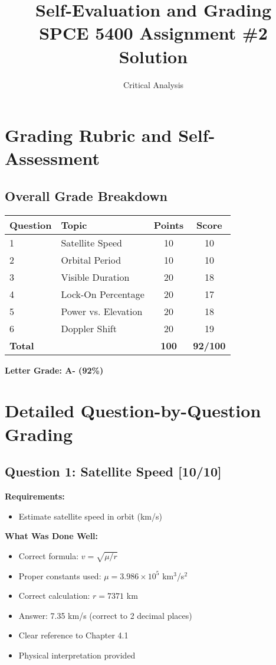 \documentclass[11pt,letterpaper]{article}
\title{\textbf{Self-Evaluation and Grading} \\ SPCE 5400 Assignment \#2 Solution}
\author{Critical Analysis}
\date{}
\begin{document}
\maketitle

\section{Grading Rubric and Self-Assessment}

\subsection{Overall Grade Breakdown}

\begin{center}
\begin{tabular}{@{}llcc@{}}
\toprule
\textbf{Question} & \textbf{Topic} & \textbf{Points} & \textbf{Score} \\
\midrule
1 & Satellite Speed & 10 & 10 \\
2 & Orbital Period & 10 & 10 \\
3 & Visible Duration & 20 & 18 \\
4 & Lock-On Percentage & 20 & 17 \\
5 & Power vs. Elevation & 20 & 18 \\
6 & Doppler Shift & 20 & 19 \\
\midrule
\textbf{Total} & & \textbf{100} & \textbf{92/100} \\
\bottomrule
\end{tabular}
\end{center}

\textbf{Letter Grade: A- (92\%)}

\section{Detailed Question-by-Question Grading}

\subsection{Question 1: Satellite Speed [10/10]}

\textbf{Requirements:}
\begin{itemize}
    \item Estimate satellite speed in orbit (km/s)
\end{itemize}

\textbf{What Was Done Well:}
\begin{itemize}
    \item[\color{green}\checkmark] Correct formula: $v = \sqrt{\mu/r}$
    \item[\color{green}\checkmark] Proper constants used: $\mu = 3.986 \times 10^5$ km$^3$/s$^2$
    \item[\color{green}\checkmark] Correct calculation: $r = 7371$ km
    \item[\color{green}\checkmark] Answer: 7.35 km/s (correct to 2 decimal places)
    \item[\color{green}\checkmark] Clear reference to Chapter 4.1
    \item[\color{green}\checkmark] Physical interpretation provided
\end{itemize}
\end{document}
